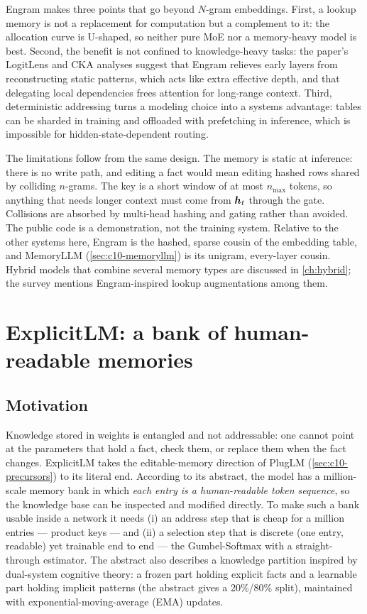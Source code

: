 Engram makes three points that go beyond $N$-gram embeddings. First, a lookup memory is not a
replacement for computation but a complement to it: the allocation curve is U-shaped, so neither
pure MoE nor a memory-heavy model is best. Second, the benefit is not confined to knowledge-heavy
tasks: the paper's LogitLens and CKA analyses suggest that Engram relieves early layers from
reconstructing static patterns, which acts like extra effective depth, and that delegating local
dependencies frees attention for long-range context. Third, deterministic addressing turns a
modeling choice into a systems advantage: tables can be sharded in training and offloaded with
prefetching in inference, which is impossible for hidden-state-dependent routing.

The limitations follow from the same design. The memory is static at inference: there is no write
path, and editing a fact would mean editing hashed rows shared by colliding $n$-grams. The key is a
short window of at most $n_{\max}$ tokens, so anything that needs longer context must come from
$\bm{h}_t$ through the gate. Collisions are absorbed by multi-head hashing and gating rather than
avoided. The public code is a demonstration, not the training system. Relative to the other systems
here, Engram is the hashed, sparse cousin of the embedding table, and MemoryLLM
(\cref{sec:c10-memoryllm}) is its unigram, every-layer cousin. Hybrid models that combine several
memory types are discussed in \cref{ch:hybrid}; the survey mentions Engram-inspired lookup
augmentations among them.

\section{ExplicitLM: a bank of human-readable memories}\label{sec:c10-explicitlm}

\subsection{Motivation}

Knowledge stored in weights is entangled and not addressable: one cannot point at the parameters
that hold a fact, check them, or replace them when the fact changes. ExplicitLM
\citep{yu2025explicitlm} takes the editable-memory direction of PlugLM (\cref{sec:c10-precursors})
to its literal end. According to its abstract, the model has a million-scale memory bank in which
\emph{each entry is a human-readable token sequence}, so the knowledge base can be inspected and
modified directly. To make such a bank usable inside a network it needs (i) an address step that is
cheap for a million entries --- product keys --- and (ii) a selection step that is discrete (one
entry, readable) yet trainable end to end --- the Gumbel-Softmax with a straight-through
estimator. The abstract also describes a knowledge partition inspired by dual-system cognitive
theory: a frozen part holding explicit facts and a learnable part holding implicit patterns
(the abstract gives a 20\%/80\% split), maintained with exponential-moving-average (EMA) updates.

